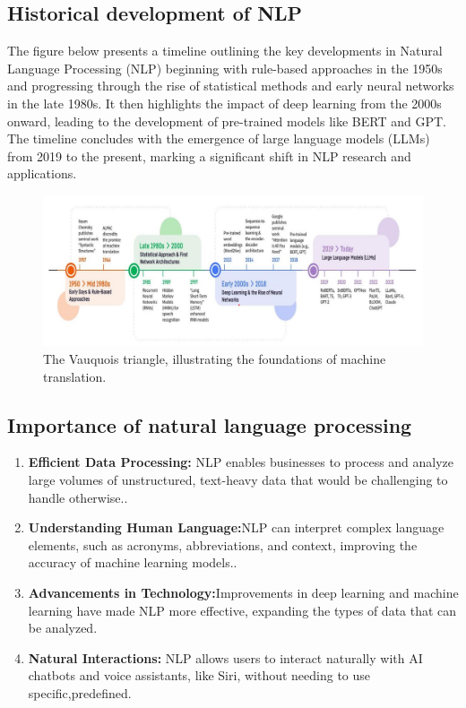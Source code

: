 \subsection{Historical development of NLP}
The figure below presents a timeline outlining the key developments in Natural Language Processing (NLP)  beginning with rule-based approaches in the 1950s and progressing through the rise of statistical methods and early neural networks in the late 1980s. It then highlights the impact of deep learning from the 2000s onward, leading to the development of pre-trained models like BERT and GPT. The timeline concludes with the emergence of large language models (LLMs) from 2019 to the present, marking a significant shift in NLP research and applications.
\begin{figure}[htbp]
	\centerline{\includegraphics[scale=.7]{Figures/the_historyOf_nlp.png}}
	\caption{The Vauquois triangle, illustrating the foundations of machine translation.}
	\label{the_historyOf_nlp.png}
\end{figure}

\subsection{Importance of natural language processing}

\begin{enumerate}
	\item \textbf{Efficient Data Processing:} NLP enables businesses to process and analyze large volumes of unstructured, text-heavy data that would be challenging to handle otherwise..

	\item \textbf{Understanding Human Language:}NLP can interpret complex language elements, such as acronyms, abbreviations, and context, improving the accuracy of machine learning models..
	
	\item \textbf{Advancements in Technology:}Improvements in deep learning and machine learning have made NLP more effective, expanding the types of data that can be analyzed.
	
	\item \textbf{Natural Interactions:} NLP allows users to interact naturally with AI chatbots and voice assistants, like Siri, without needing to use specific,predefined\cite{techtarget_nlp}.
	
\end{enumerate}

